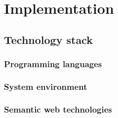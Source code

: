 \chapter{Implementation}

\section{Technology stack}

\subsection{Programming languages}

\subsection{System environment}

\subsection{Semantic web technologies}

